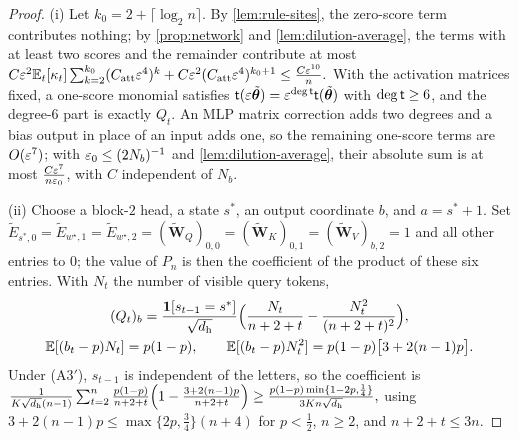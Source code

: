 \begin{proof}
(i) Let $k_0=2+\lceil\log_2n\rceil$. By \cref{lem:rule-sites}, the zero-score term contributes nothing; by \cref{prop:network} and
\cref{lem:dilution-average}, the terms with at least two scores and the remainder contribute at most
 $C\varepsilon^2\mathbb E_t[\kappa_t]\sum_{k=2}^{k_0}(C_{\mathrm{att}}\varepsilon^4)^k+C\varepsilon^2(C_{\mathrm{att}}\varepsilon^4)^{k_0+1}\le\frac{C\varepsilon^{10}}{n} .$ 
With the activation matrices fixed, a one-score monomial satisfies $\mathsf t(\varepsilon\tilde{\bm\theta})=\varepsilon^{\deg\mathsf t}\mathsf t(\tilde{\bm\theta})$ with $\deg\mathsf t\ge6$, and the
degree-$6$ part is exactly $Q_t$. An MLP matrix correction adds two degrees and a bias output in place of an input adds one, so the
remaining one-score terms are $O(\varepsilon^7)$; with $\varepsilon_0\le(2N_b)^{-1}$ and \cref{lem:dilution-average}, their absolute sum is at most
$\frac{C\varepsilon^7}{n\varepsilon_0}$, with $C$ independent of $N_b$.

(ii) Choose a block-$2$ head, a state $s^\ast$, an output coordinate $b$, and $a=s^\ast+1$. Set
$\tilde E_{s^\ast,0}=\tilde E_{w^\star,1}=\tilde E_{w^\star,2}=(\tilde{\mathbf W}_Q)_{0,0}=(\tilde{\mathbf W}_K)_{0,1}=(\tilde{\mathbf W}_V)_{b,2}=1$ and all other entries to $0$; the value of $P_n$ is then the
coefficient of the product of these six entries. With $N_t$ the number of visible query tokens,
\begin{gather*}
 (Q_t)_b=\frac{\mathbf 1[s_{t-1}=s^\ast]}{\sqrt{d_{\mathrm h}}}\Bigl(\frac{N_t}{n+2+t}-\frac{N_t^2}{(n+2+t)^2}\Bigr),\\
 \mathbb E[(b_t-p)N_t]=p(1-p),\qquad \mathbb E[(b_t-p)N_t^2]=p(1-p)\bigl[3+2(n-1)p\bigr].
\end{gather*}
Under (A3$'$), $s_{t-1}$ is independent of the letters, so the coefficient is
 $\frac{1}{K\sqrt{d_{\mathrm h}}(n-1)}\sum_{t=2}^n\frac{p(1-p)}{n+2+t}\Bigl(1-\frac{3+2(n-1)p}{n+2+t}\Bigr) \ge\frac{p(1-p)\min\{1-2p,\frac{1}{4}\}}{3Kn\sqrt{d_{\mathrm h}}},$ 
using $3+2(n-1)p\le\max\{2p,\frac{3}{4}\}(n+4)$ for $p<\frac{1}{2}$, $n\ge2$, and $n+2+t\le3n$.
\end{proof}



